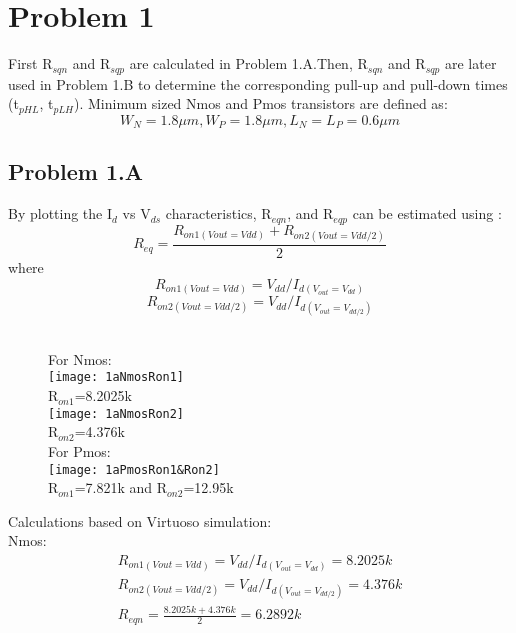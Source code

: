 \documentclass{article}
\begin{document}
   \section{Problem 1}
   First R$_{sqn}$ and R$_{sqp}$ are calculated in Problem 1.A.Then, R$_{sqn}$ and R$_{sqp}$ are later used in Problem 1.B to determine the corresponding pull-up and pull-down times (t$_{pHL}$, t$_{pLH}$). Minimum sized Nmos and Pmos transistors are defined as:
   \begin{displaymath}
   W_{N}=1.8\mu m, W_{P}=1.8 \mu m, L_{N}= L_{P}=0.6\mu m
   \end{displaymath}
   \subsection{Problem 1.A}
   By plotting the I$_{d}$ vs V$_{ds}$ characteristics, R$_{eqn}$, and R$_{eqp}$ can be estimated using :
   \begin{displaymath}
   R_{eq}= \frac{R_{on1(Vout=Vdd)}+ R_{on2(Vout=Vdd/2)}}{2}
   \end{displaymath}
   where
   \begin{displaymath}
   R_{on1(Vout=Vdd)}= V_{dd}/I_{d(V_{out}=V_{dd})} 
   \end{displaymath}
   \begin{displaymath}
   R_{on2(Vout=Vdd/2)}= V_{dd}/I_{d(V_{out}=V_{dd/2})} 
   \end{displaymath}
\\
 \begin{figure}
   \centering
For Nmos:
\\
	\texttt{[image: 1aNmosRon1]}
	\\R$_{on1}$=8.2025k\\
	\texttt{[image: 1aNmosRon2]}
    \\R$_{on2}$=4.376k\\
For Pmos:
\\
	\texttt{[image: 1aPmosRon1\&Ron2]}
	\\R$_{on1}$=7.821k and R$_{on2}$=12.95k\\
\end{figure}
Calculations based on Virtuoso simulation:
   \\
   Nmos:
   \begin{gather}
   R_{on1(Vout=Vdd)}=V_{dd}/I_{d(V_{out}=V_{dd})}=8.2025k                  
   \\
   R_{on2(Vout=Vdd/2)}= V_{dd}/I_{d(V_{out}=V_{dd/2})}=4.376k
   \\
   R_{eqn}= \frac{{8.2025k}+{4.376k}}{2} =6.2892k
   \end{gather}
\end{document}
